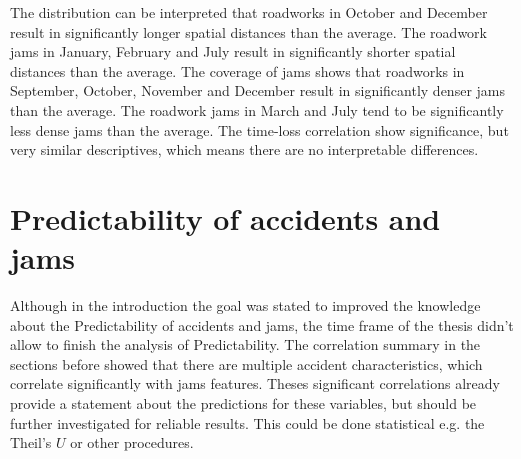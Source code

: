 The distribution can be interpreted that roadworks in October and December result in significantly longer spatial distances than the average. The roadwork jams in January, February and July result in significantly shorter spatial distances than the average. The coverage of jams shows that roadworks in September, October, November and December result in significantly denser jams than the average. The roadwork jams in March and July tend to be significantly less dense jams than the average. The time-loss correlation show significance, but very similar descriptives, which means there are no interpretable differences.

\section{Predictability of accidents and jams}
Although in the introduction the goal was stated to improved the knowledge about the Predictability of accidents and jams, the time frame of the thesis didn't allow to finish the analysis of Predictability. The correlation summary in the sections before showed that there are multiple accident characteristics, which correlate significantly with jams features. Theses significant correlations already provide a statement about the predictions for these variables, but should be further investigated for reliable results. This could be done statistical e.g. the Theil's $U$ or other procedures.

